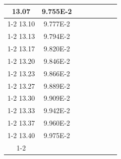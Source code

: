 \documentclass[article,12pt]{elsarticle}
\begin{document}
\begin{longtable}[c]{|c|c|cccccc}
13.07    & 9.755E-2  &                       &                              &                            &                       &                              &                               \\ \cline{1-2}
13.10    & 9.777E-2  &                       &                              &                            &                       &                              &                               \\ \cline{1-2}
13.13    & 9.794E-2  &                       &                              &                            &                       &                              &                               \\ \cline{1-2}
13.17    & 9.820E-2  &                       &                              &                            &                       &                              &                               \\ \cline{1-2}
13.20    & 9.846E-2  &                       &                              &                            &                       &                              &                               \\ \cline{1-2}
13.23    & 9.866E-2  &                       &                              &                            &                       &                              &                               \\ \cline{1-2}
13.27    & 9.889E-2  &                       &                              &                            &                       &                              &                               \\ \cline{1-2}
13.30    & 9.909E-2  &                       &                              &                            &                       &                              &                               \\ \cline{1-2}
13.33    & 9.942E-2  &                       &                              &                            &                       &                              &                               \\ \cline{1-2}
13.37    & 9.960E-2  &                       &                              &                            &                       &                              &                               \\ \cline{1-2}
13.40    & 9.975E-2  &                       &                              &                            &                       &                              &                               \\ \cline{1-2}

\end{longtable}
\end{document}
